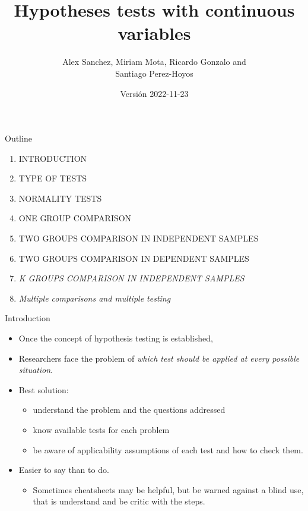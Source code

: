 \documentclass[
  ignorenonframetext,
]{beamer}
\title{Hypotheses tests with continuous variables}
\author{Alex Sanchez, Miriam Mota, Ricardo Gonzalo and\\
Santiago Perez-Hoyos}
\date{Versión 2022-11-23}
\institute{Statistics and Bioinformatics Unit. Vall d'Hebron Institut de
Recerca}
\providecommand{\tightlist}{%
  \setlength{\itemsep}{0pt}\setlength{\parskip}{0pt}}
\begin{document}
\frame{\titlepage}

\begin{frame}{Outline}
\protect\hypertarget{outline}{}
\begin{enumerate}
\tightlist
\item
  INTRODUCTION
\item
  TYPE OF TESTS
\item
  NORMALITY TESTS
\item
  ONE GROUP COMPARISON
\item
  TWO GROUPS COMPARISON IN INDEPENDENT SAMPLES
\item
  TWO GROUPS COMPARISON IN DEPENDENT SAMPLES
\item
  \emph{K GROUPS COMPARISON IN INDEPENDENT SAMPLES}
\item
  \emph{Multiple comparisons and multiple testing}
\end{enumerate}
\end{frame}

\begin{frame}{Introduction}
\protect\hypertarget{introduction}{}
\begin{itemize}
\tightlist
\item
  Once the concept of hypothesis testing is established,
\item
  Researchers face the problem of \emph{which test should be applied at
  every possible situation}.
\item
  Best solution:

  \begin{itemize}
  \tightlist
  \item
    understand the problem and the questions addressed
  \item
    know available tests for each problem
  \item
    be aware of applicability assumptions of each test and how to check
    them.
  \end{itemize}
\item
  Easier to say than to do.

  \begin{itemize}
  \tightlist
  \item
    Sometimes cheatsheets may be helpful, but be warned against a blind
    use, that is understand and be critic with the steps.
  \end{itemize}
\end{itemize}
\end{frame}
\end{document}
